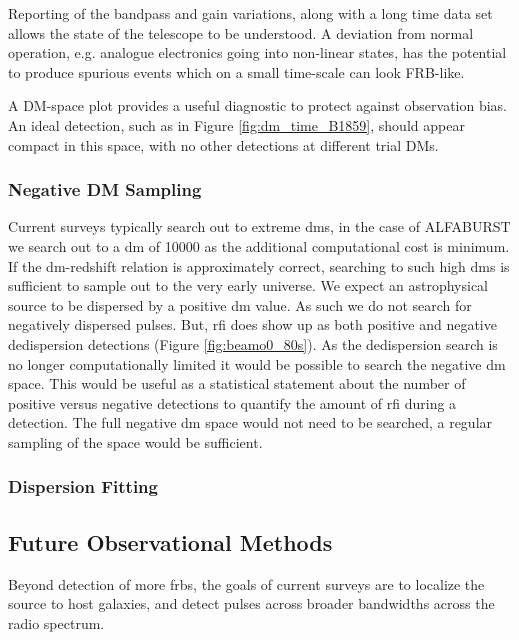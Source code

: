 \documentclass[a4paper,fleqn,usenatbib]{mnras}
\begin{document}
Reporting of the bandpass and gain variations, along with a long time data set
allows the state of the telescope to be understood. A deviation from normal
operation, e.g. analogue electronics going into non-linear states, has the
potential to produce spurious events which on a small time-scale can look
FRB-like.

A DM-space plot provides a useful diagnostic to protect against observation
bias. An ideal detection, such as in Figure \ref{fig:dm_time_B1859}, should
appear compact in this space, with no other detections at different trial DMs.

\subsubsection{Negative DM Sampling}

Current surveys typically search out to extreme \glspl{dm}, in the case of
ALFABURST we search out to a \gls{dm} of 10000 as the additional computational
cost is minimum. If the \gls{dm}-redshift relation is approximately correct,
searching to such high \glspl{dm} is sufficient to sample out to the very early
universe. We expect an astrophysical source to be dispersed by a positive
\gls{dm} value. As such we do not search for negatively dispersed pulses. But,
\gls{rfi} does show up as both positive and negative dedispersion detections
(Figure \ref{fig:beamo0_80s}). As the dedispersion search is no longer
computationally limited it would be possible to search the negative \gls{dm}
space. This would be useful as a statistical statement about the number of
positive versus negative detections to quantify the amount of \gls{rfi} during a
detection. The full negative \gls{dm} space would not need to be searched, a
regular sampling of the space would be sufficient.

\subsubsection{Dispersion Fitting}


\subsection{Future Observational Methods}

Beyond detection of more \glspl{frb}, the goals of current surveys are to
localize the source to host galaxies, and detect pulses across broader
bandwidths across the radio spectrum.
\end{document}
